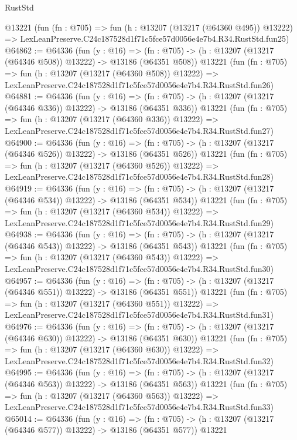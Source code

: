 \begin{lexlean}{RustStd}
\begin{coremodule}
    @13221
    (fun (fn : @705) =>
    fun (h : @13207 (@13217 (@64360 @495)) @13222) =>
    LexLeanPreserve.C24c187528d1f71c5fce57d0056e4e7b4.R34.RustStd.fun25)
@64862 := @64336
    (fun (y : @16) =>
    (fn : @705) -> (h : @13207 (@13217 (@64346 @508)) @13222) -> @13186 (@64351 @508))
    @13221
    (fun (fn : @705) =>
    fun (h : @13207 (@13217 (@64360 @508)) @13222) =>
    LexLeanPreserve.C24c187528d1f71c5fce57d0056e4e7b4.R34.RustStd.fun26)
@64881 := @64336
    (fun (y : @16) =>
    (fn : @705) -> (h : @13207 (@13217 (@64346 @336)) @13222) -> @13186 (@64351 @336))
    @13221
    (fun (fn : @705) =>
    fun (h : @13207 (@13217 (@64360 @336)) @13222) =>
    LexLeanPreserve.C24c187528d1f71c5fce57d0056e4e7b4.R34.RustStd.fun27)
@64900 := @64336
    (fun (y : @16) =>
    (fn : @705) -> (h : @13207 (@13217 (@64346 @526)) @13222) -> @13186 (@64351 @526))
    @13221
    (fun (fn : @705) =>
    fun (h : @13207 (@13217 (@64360 @526)) @13222) =>
    LexLeanPreserve.C24c187528d1f71c5fce57d0056e4e7b4.R34.RustStd.fun28)
@64919 := @64336
    (fun (y : @16) =>
    (fn : @705) -> (h : @13207 (@13217 (@64346 @534)) @13222) -> @13186 (@64351 @534))
    @13221
    (fun (fn : @705) =>
    fun (h : @13207 (@13217 (@64360 @534)) @13222) =>
    LexLeanPreserve.C24c187528d1f71c5fce57d0056e4e7b4.R34.RustStd.fun29)
@64938 := @64336
    (fun (y : @16) =>
    (fn : @705) -> (h : @13207 (@13217 (@64346 @543)) @13222) -> @13186 (@64351 @543))
    @13221
    (fun (fn : @705) =>
    fun (h : @13207 (@13217 (@64360 @543)) @13222) =>
    LexLeanPreserve.C24c187528d1f71c5fce57d0056e4e7b4.R34.RustStd.fun30)
@64957 := @64336
    (fun (y : @16) =>
    (fn : @705) -> (h : @13207 (@13217 (@64346 @551)) @13222) -> @13186 (@64351 @551))
    @13221
    (fun (fn : @705) =>
    fun (h : @13207 (@13217 (@64360 @551)) @13222) =>
    LexLeanPreserve.C24c187528d1f71c5fce57d0056e4e7b4.R34.RustStd.fun31)
@64976 := @64336
    (fun (y : @16) =>
    (fn : @705) -> (h : @13207 (@13217 (@64346 @630)) @13222) -> @13186 (@64351 @630))
    @13221
    (fun (fn : @705) =>
    fun (h : @13207 (@13217 (@64360 @630)) @13222) =>
    LexLeanPreserve.C24c187528d1f71c5fce57d0056e4e7b4.R34.RustStd.fun32)
@64995 := @64336
    (fun (y : @16) =>
    (fn : @705) -> (h : @13207 (@13217 (@64346 @563)) @13222) -> @13186 (@64351 @563))
    @13221
    (fun (fn : @705) =>
    fun (h : @13207 (@13217 (@64360 @563)) @13222) =>
    LexLeanPreserve.C24c187528d1f71c5fce57d0056e4e7b4.R34.RustStd.fun33)
@65014 := @64336
    (fun (y : @16) =>
    (fn : @705) -> (h : @13207 (@13217 (@64346 @577)) @13222) -> @13186 (@64351 @577))
    @13221

\end{coremodule}
\end{lexlean}
